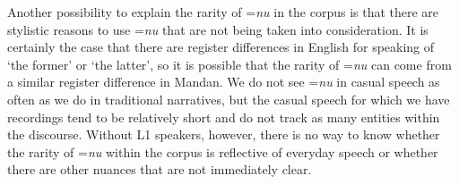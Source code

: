 Another possibility to explain the rarity of =\textit{nu} in the corpus is that there are stylistic reasons to use =\textit{nu} that are not being taken into consideration. It is certainly the case that there are register differences in English for speaking of `the former' or `the latter', so it is possible that the rarity of =\textit{nu} can come from a similar register difference in Mandan. We do not see =\textit{nu} in casual speech as often as we do in traditional narratives, but the casual speech for which we have recordings tend to be relatively short and do not track as many entities within the discourse. Without L1 speakers, however, there is no way to know whether the rarity of =\textit{nu} within the corpus is reflective of everyday speech or whether there are other nuances that are not immediately clear.
